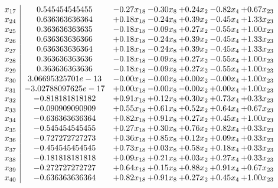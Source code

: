 \documentclass[8pt]{article}
\begin{document}
\[\begin{array}{c| c c@{\hskip 2pt} c@{\hskip 2pt} c@{\hskip 2pt} c@{\hskip 2pt} c@{\hskip 2pt} }
 x_{17}   &  0.545454545455 & -0.27 x_{18} & -0.30 x_{8} & +  0.24 x_{2} & -0.82 x_{4} & +  0.67 x_{23}\\
 x_{24}   &  0.636363636364 & +  0.18 x_{18} & -0.24 x_{8} & +  0.39 x_{2} & -0.45 x_{4} & +  1.33 x_{23}\\
 x_{25}   &  0.363636363635 & -0.18 x_{18} & -0.09 x_{8} & +  0.27 x_{2} & -0.55 x_{4} & +  1.00 x_{23}\\
 x_{26}   &  0.636363636366 & +  0.18 x_{18} & -0.24 x_{8} & +  0.39 x_{2} & -0.45 x_{4} & +  1.33 x_{23}\\
 x_{27}   &  0.636363636364 & +  0.18 x_{18} & -0.24 x_{8} & +  0.39 x_{2} & -0.45 x_{4} & +  1.33 x_{23}\\
 x_{28}   &  0.363636363636 & -0.18 x_{18} & -0.09 x_{8} & +  0.27 x_{2} & -0.55 x_{4} & +  1.00 x_{23}\\
 x_{29}   &  0.363636363636 & -0.18 x_{18} & -0.09 x_{8} & +  0.27 x_{2} & -0.55 x_{4} & +  1.00 x_{23}\\
 x_{30}   &  3.06695325701e-13 & -0.00 x_{18} & -0.00 x_{8} & +  0.00 x_{2} & -0.00 x_{4} & +  1.00 x_{23}\\
 x_{31}   &  -3.02788097625e-17 & +  0.00 x_{18} & -0.00 x_{8} & -0.00 x_{2} & +  0.00 x_{4} & +  1.00 x_{23}\\
 x_{32}   &  -0.818181818182 & +  0.91 x_{18} & +  0.12 x_{8} & +  0.30 x_{2} & +  0.73 x_{4} & +  0.33 x_{23}\\
 x_{33}   &  -0.090909090909 & +  0.55 x_{18} & +  0.61 x_{8} & +  0.52 x_{2} & +  0.64 x_{4} & +  0.67 x_{23}\\
 x_{34}   &  -0.636363636364 & +  0.82 x_{18} & +  0.91 x_{8} & +  0.27 x_{2} & +  0.45 x_{4} & +  1.00 x_{23}\\
 x_{35}   &  -0.545454545455 & +  0.27 x_{18} & +  0.30 x_{8} & +  0.76 x_{2} & +  0.82 x_{4} & +  0.33 x_{23}\\
 x_{36}   &  -0.727272727273 & +  0.36 x_{18} & +  0.85 x_{8} & +  0.12 x_{2} & +  0.09 x_{4} & +  0.33 x_{23}\\
 x_{37}   &  -0.454545454545 & +  0.73 x_{18} & +  0.03 x_{8} & +  0.58 x_{2} & +  0.18 x_{4} & +  0.33 x_{23}\\
 x_{38}   &  -0.181818181818 & +  0.09 x_{18} & +  0.21 x_{8} & +  0.03 x_{2} & +  0.27 x_{4} & +  0.33 x_{23}\\
 x_{39}   &  -0.272727272727 & +  0.64 x_{18} & +  0.15 x_{8} & +  0.88 x_{2} & +  0.91 x_{4} & +  0.67 x_{23}\\
 x_{40}   &  -0.636363636364 & +  0.82 x_{18} & +  0.91 x_{8} & +  0.27 x_{2} & +  0.45 x_{4} & +  1.00 x_{23}\\

\end{array}\]
\end{document}
